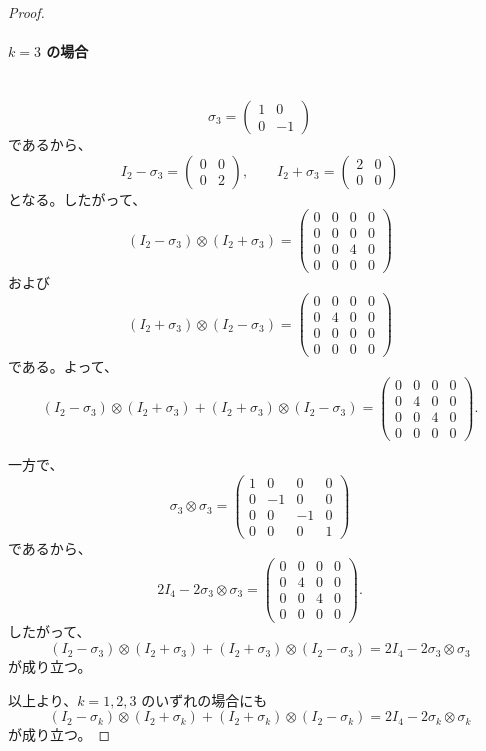 \documentclass[dvipdfmx,a4paper]{jsarticle}
\theoremstyle{mystyle}
\begin{document}
\begin{proof}
\paragraph{\textbf{$k=3$ の場合}} \ \\
\[
\sigma_3=
\begin{pmatrix}
1 & 0\\
0 & -1
\end{pmatrix}
\]
であるから、
\[
I_2-\sigma_3=
\begin{pmatrix}
0 & 0\\
0 & 2
\end{pmatrix},
\qquad
I_2+\sigma_3=
\begin{pmatrix}
2 & 0\\
0 & 0
\end{pmatrix}
\]
となる。したがって、
\[
(I_2-\sigma_3)\otimes(I_2+\sigma_3)
=
\begin{pmatrix}
0 & 0 & 0 & 0\\
0 & 0 & 0 & 0\\
0 & 0 & 4 & 0\\
0 & 0 & 0 & 0
\end{pmatrix}
\]
および
\[
(I_2+\sigma_3)\otimes(I_2-\sigma_3)
=
\begin{pmatrix}
0 & 0 & 0 & 0\\
0 & 4 & 0 & 0\\
0 & 0 & 0 & 0\\
0 & 0 & 0 & 0
\end{pmatrix}
\]
である。よって、
\[
(I_2-\sigma_3)\otimes(I_2+\sigma_3)
+(I_2+\sigma_3)\otimes(I_2-\sigma_3)
=
\begin{pmatrix}
0 & 0 & 0 & 0\\
0 & 4 & 0 & 0\\
0 & 0 & 4 & 0\\
0 & 0 & 0 & 0
\end{pmatrix}.
\]

一方で、
\[
\sigma_3\otimes\sigma_3
=
\begin{pmatrix}
1 & 0 & 0 & 0\\
0 & -1 & 0 & 0\\
0 & 0 & -1 & 0\\
0 & 0 & 0 & 1
\end{pmatrix}
\]
であるから、
\[
2I_4-2\sigma_3\otimes\sigma_3
=
\begin{pmatrix}
0 & 0 & 0 & 0\\
0 & 4 & 0 & 0\\
0 & 0 & 4 & 0\\
0 & 0 & 0 & 0
\end{pmatrix}.
\]
したがって、
\[
(I_2-\sigma_3)\otimes(I_2+\sigma_3)
+(I_2+\sigma_3)\otimes(I_2-\sigma_3)
=
2I_4-2\sigma_3\otimes\sigma_3
\]
が成り立つ。

\medskip
\noindent
以上より、$k=1,2,3$ のいずれの場合にも
\[
(I_2-\sigma_k)\otimes(I_2+\sigma_k)
+(I_2+\sigma_k)\otimes(I_2-\sigma_k)
=
2I_4-2\sigma_k\otimes\sigma_k
\]
が成り立つ。

\end{proof}
\end{document}
